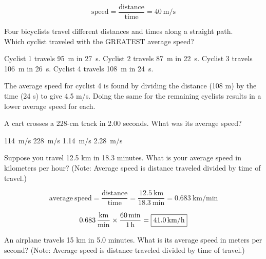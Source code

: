 \documentclass[answers]{exam}
\begin{document}
\begin{questions}
\begin{questions}
\begin{solution}
\begin{equation*}
    \text{speed} = \frac{\text{distance}}{\text{time}} = \SI{40}{\meter/\second}
\end{equation*}
\end{solution}

\question
Four bicyclists travel different distances and times along a straight path. \\
Which cyclist traveled with the GREATEST average speed?

\begin{choices}
\choice Cyclist 1 travels \SI{95}{m} in \SI{27}{s}.
\choice Cyclist 2 travels \SI{87}{m} in \SI{22}{s}.
\choice Cyclist 3 travels \SI{106}{m} in \SI{26}{s}.
\CorrectChoice Cyclist 4 travels \SI{108}{m} in \SI{24}{s}.
\end{choices}

\begin{solution}
The average speed for cyclist 4 is found by dividing the distance (108 m) by the time (24 s) to give 4.5 m/s. Doing the same for the remaining cyclists results in a lower average speed for each.
\end{solution}


\question
A cart crosses a 228-cm track in 2.00 seconds. What was its average speed?

\begin{choices}
    \choice \SI{114}{m/s}
    \choice \SI{228}{m/s}
    \correctchoice \SI{1.14}{m/s}
    \choice \SI{2.28}{m/s}
\end{choices}

\question
Suppose you travel 12.5 km in 18.3 minutes. What is your average speed in kilometers per hour? (Note: Average speed is distance traveled divided by time of travel.)

\begin{solution}
\begin{equation*}
    \mathrm{average\ speed = \frac{distance}{time}} = \frac{\SI{12.5}{\kilo\meter}}{\SI{18.3}{\minute}} = \SI[per-mode=fraction]{0.683}{\kilo\meter\per\minute}
\end{equation*}

\begin{equation*}
    \SI[per-mode=fraction]{0.683}{\kilo\meter\per\minute} \times \frac{\SI{60}{\min}}{\SI{1}{\hour}} = \framebox{\SI{41.0}{\kilo\meter/\hour}}
\end{equation*}
\end{solution}

\question
An airplane travels 15 km in 5.0 minutes. What is its average speed in meters per second? (Note: Average speed is distance traveled divided by time of travel.)


\end{questions}
\end{questions}
\end{document}
